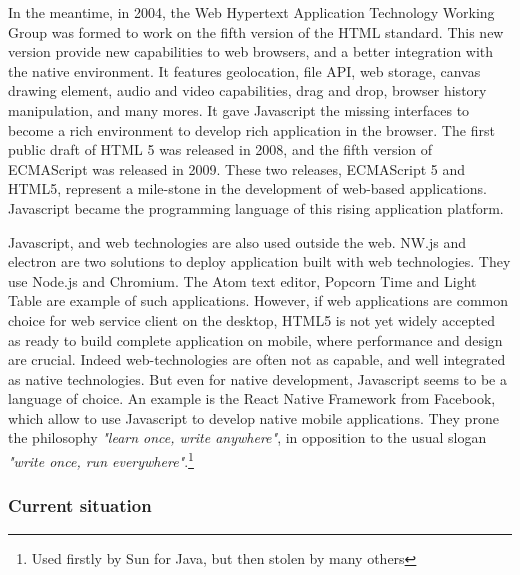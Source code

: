 In the meantime, in 2004, the Web Hypertext Application Technology Working Group was formed to work on the fifth version of the HTML standard.
This new version provide new capabilities to web browsers, and a better integration with the native environment.
It features geolocation, file API, web storage, canvas drawing element, audio and video capabilities, drag and drop, browser history manipulation, and many mores.
It gave Javascript the missing interfaces to become a rich environment to develop rich application in the browser.
The first public draft of HTML 5 was released in 2008, and the fifth version of ECMAScript was released in 2009.
These two releases, ECMAScript 5 and HTML5, represent a mile-stone in the development of web-based applications.
Javascript became the programming language of this rising application platform.

Javascript, and web technologies are also used outside the web.
NW.js and electron are two solutions to deploy application built with web technologies.
They use Node.js and Chromium.
The Atom text editor, Popcorn Time and Light Table are example of such applications.
However, if web applications are common choice for web service client on the desktop, HTML5 is not yet widely accepted as ready to build complete application on mobile, where performance and design are crucial.
Indeed web-technologies are often not as capable, and well integrated as native technologies.
But even for native development, Javascript seems to be a language of choice.
An example is the React Native Framework from Facebook, which allow to use Javascript to develop native mobile applications.
They prone the philosophy \textit{"learn once, write anywhere"}, in opposition to the usual slogan \textit{"write once, run everywhere"}.\footnote{Used firstly by Sun for Java, but then stolen by many others}

\subsubsection{Current situation}


